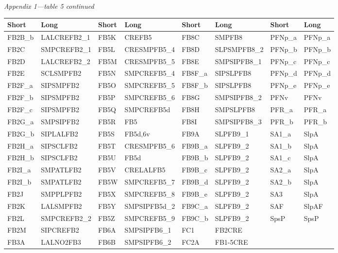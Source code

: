 \documentclass{article}
\begin{document}
\noindent\emph{Appendix 1—table 5 continued}
\begin{center}\scriptsize
\begin{longtable}{llllllll}
\textbf{Short} & \textbf{Long} & \textbf{Short} & \textbf{Long} & \textbf{Short} & \textbf{Long} & \textbf{Short} & \textbf{Long} \\
\hline
FB2B\_b & LALCREFB2\_1 & FB5K & CREFB5 & FB8C & SMPFB8 & PFNp\_a & PFNp\_a \\
FB2C & SMPCREFB2\_1 & FB5L & CRESMPFB5\_4 & FB8D & SLPSMPFB8\_2 & PFNp\_b & PFNp\_b \\
FB2D & LALCREFB2\_2 & FB5M & CRESMPFB5\_5 & FB8E & SMPSIPFB8\_1 & PFNp\_c & PFNp\_c \\
FB2E & SCLSMPFB2 & FB5N & SMPCREFB5\_4 & FB8F\_a & SIPSLPFB8 & PFNp\_d & PFNp\_d \\
FB2F\_a & SIPSMPFB2 & FB5O & SMPCREFB5\_5 & FB8F\_b & SIPSLPFB8 & PFNp\_e & PFNp\_e \\
FB2F\_b & SIPSMPFB2 & FB5P & SMPCREFB5\_6 & FB8G & SMPSIPFB8\_2 & PFNv & PFNv \\
FB2F\_c & SIPSMPFB2 & FB5Q & SMPCREFB5d & FB8H & SMPSLPFB8 & PFR\_a & PFR\_a \\
FB2G\_a & SMPSIPFB2 & FB5R & FB5 & FB8I & SMPSIPFB8\_3 & PFR\_b & PFR\_b \\
FB2G\_b & SIPLALFB2 & FB5S & FB5d,6v & FB9A & SLPFB9\_1 & SA1\_a & SlpA \\
FB2H\_a & SIPSCLFB2 & FB5T & CRESMPFB5\_6 & FB9B\_a & SLPFB9\_2 & SA1\_b & SlpA \\
FB2H\_b & SIPSCLFB2 & FB5U & FB5d & FB9B\_b & SLPFB9\_2 & SA1\_c & SlpA \\
FB2I\_a & SMPATLFB2 & FB5V & CRELALFB5 & FB9B\_c & SLPFB9\_2 & SA2\_a & SlpA \\
FB2I\_b & SMPATLFB2 & FB5W & SMPCREFB5\_7 & FB9B\_d & SLPFB9\_2 & SA2\_b & SlpA \\
FB2J & SMPPLPFB2 & FB5X & SMPCREFB5\_8 & FB9B\_e & SLPFB9\_2 & SA3 & SlpA \\
FB2K & LALSMPFB2 & FB5Y & SMPSIPFB5d\_2 & FB9C\_a & SLPFB9\_2 & SAF & SlpAF \\
FB2L & SMPCREFB2\_2 & FB5Z & SMPCREFB5\_9 & FB9C\_b & SLPFB9\_2 & SpsP & SpsP \\
FB2M & SIPCREFB2 & FB6A & SMPSIPFB6\_1 & FC1 & FB2CRE &  &  \\
FB3A & LALNO2FB3 & FB6B & SMPSIPFB6\_2 & FC2A & FB1-5CRE &  &  \\
\end{longtable}
\end{center}
\end{document}
